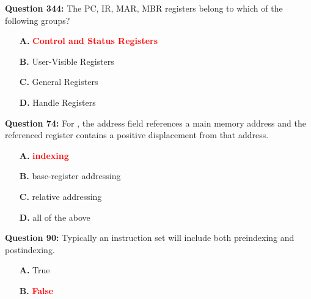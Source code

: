 \documentclass[12pt,a4paper]{article}
\begin{document}
\vspace{0.5cm}

\vspace{0.5cm}

\textbf{Question 344:} The PC, IR, MAR, MBR registers belong to which of the following groups?

\begin{itemize}
    \item[\textbf{A.}] \textcolor{red}{\textbf{Control and Status Registers}}
    \item[\textbf{B.}] User-Visible Registers
    \item[\textbf{C.}] General Registers
    \item[\textbf{D.}] Handle Registers
\end{itemize}

\vspace{0.5cm}

\vspace{0.5cm}

\textbf{Question 74:} For \underline{\hspace{1.5cm}}, the address field references a main memory address and the referenced register contains a positive displacement from that address.

\begin{itemize}
    \item[\textbf{A.}] \textcolor{red}{\textbf{indexing}}
    \item[\textbf{B.}] base-register addressing
    \item[\textbf{C.}] relative addressing
    \item[\textbf{D.}] all of the above
\end{itemize}

\vspace{0.5cm}

\vspace{0.5cm}

\textbf{Question 90:} Typically an instruction set will include both preindexing and postindexing.

\begin{itemize}
    \item[\textbf{A.}] True
    \item[\textbf{B.}] \textcolor{red}{\textbf{False}}
\end{itemize}

\vspace{0.5cm}

\vspace{0.5cm}
\end{document}
